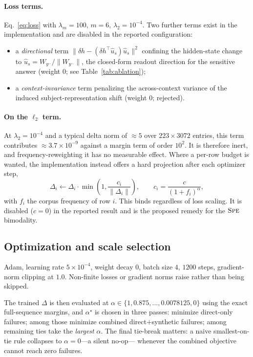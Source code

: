 \documentclass[11pt]{article}
\newcommand{\Spe}{\textsc{Spe}}
\begin{document}
\paragraph{Loss terms.} Eq.~\eqref{eq:loss} with $\lambda_m = 100$, $m = 6$,
$\lambda_2 = 10^{-4}$. Two further terms exist in the implementation and are
disabled in the reported configuration:
\begin{itemize}
\item a \emph{directional} term
      $\lVert \delta h - (\delta h^\top \hat u_s)\hat u_s \rVert^2$ confining
      the hidden-state change to
      $\hat u_s = W_{y^-}/\lVert W_{y^-}\rVert$, the closed-form readout
      direction for the sensitive answer (weight $0$; see
      Table~\ref{tab:ablation});
\item a \emph{context-invariance} term penalizing the across-context variance
      of the induced subject-representation shift (weight $0$; rejected).
\end{itemize}

\paragraph{On the $\ell_2$ term.} At $\lambda_2 = 10^{-4}$ and a typical delta
norm of $\approx 5$ over $223 \times 3072$ entries, this term contributes
$\approx 3.7\times10^{-9}$ against a margin term of order $10^{2}$. It is
therefore inert, and frequency-reweighting it has no measurable effect. Where a
per-row budget is wanted, the implementation instead offers a hard projection
after each optimizer step,
\begin{equation}
\Delta_i \leftarrow \Delta_i \cdot
\min\!\left(1, \frac{c_i}{\lVert \Delta_i \rVert}\right),
\qquad
c_i = \frac{c}{(1 + f_i)^{\alpha}},
\end{equation}
with $f_i$ the corpus frequency of row $i$. This binds regardless of loss
scaling. It is disabled ($c = 0$) in the reported result and is the proposed
remedy for the $\Spe$ bimodality.

\subsection{Optimization and scale selection}

Adam, learning rate $5\times10^{-4}$, weight decay $0$, batch size $4$, $1200$
steps, gradient-norm clipping at $1.0$. Non-finite losses or gradient norms
raise rather than being skipped.

The trained $\Delta$ is then evaluated at
$\alpha \in \{1, 0.875, \dots, 0.0078125, 0\}$ using the exact full-sequence
margins, and $\alpha^\star$ is chosen in three passes: minimize direct-only
failures; among those minimize combined direct$+$synthetic failures; among
remaining ties take the \emph{largest} $\alpha$. The final tie-break matters:
a naive smallest-on-tie rule collapses to $\alpha = 0$---a silent no-op---
whenever the combined objective cannot reach zero failures.
\end{document}
